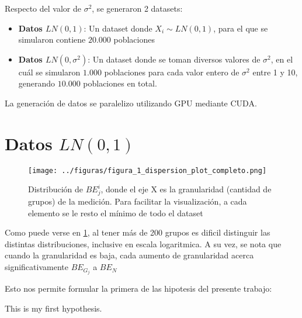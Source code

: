Respecto del valor de $\sigma^2$, se generaron 2 datasets:

\begin{itemize}
    \item \textbf{Datos $LN(0,1)$}: Un dataset donde $X_i \sim LN(0,1)$, para el que se simularon contiene $20.000$ poblaciones
    \item \textbf{Datos $LN(0,\sigma^2)$}: Un dataset donde se toman diversos valores de $\sigma^2$, en el cuál se simularon $1.000$ poblaciones para cada valor entero de $\sigma^2$ entre 1 y 10, generando $10.000$ poblaciones en total.
\end{itemize}

La generación de datos se paralelizo utilizando GPU mediante CUDA\cite{lasorsa2024simluacion_cuda}.

\section{Datos $LN(0,1)$}

\begin{figure}[H] %
    \centering %
    \texttt{[image: ../figuras/figura\_1\_dispersion\_plot\_completo.png]} %
    \caption{Distribución de $BE_j^i$, donde el eje X es la granularidad (cantidad de grupos) de la medición. Para facilitar la visualización, a cada elemento se le resto el mínimo de todo el dataset}
    \label{fig:figura_1} %
\end{figure}

Como puede verse en \ref{fig:figura_1}, al tener más de 200 grupos es dificil distinguir las distintas distribuciones, inclusive en escala logaritmica. A su vez, se nota que cuando la granularidad es baja, cada aumento de granularidad acerca significativamente $BE_{G_j}$ a $BE_N$

Esto nos permite formular la primera de las hipotesis del presente trabajo:

%


\begin{hyp} \label{hyp:first}
    This is my first hypothesis.
\end{hyp}

